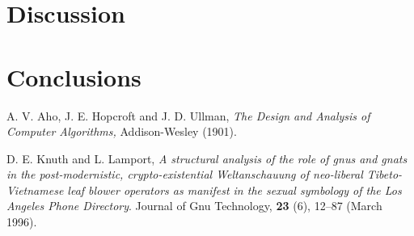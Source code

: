 \documentclass[11pt,twoside]{article}
\begin{document}
\section{Discussion}


\section{Conclusions}

 

\begin{thebibliography}{99}

 A. V. Aho, J. E. Hopcroft and J.  D.  Ullman, {\it The
Design and Analysis of Computer Algorithms,} Addison-Wesley (1901).

 D. E. Knuth and L. Lamport, {\it A structural analysis
of the role of gnus and gnats in the post-modernistic, crypto-existential 
Weltanschauung of neo-liberal Tibeto-Vietnamese leaf blower operators 
as manifest in the sexual symbology of the Los Angeles Phone Directory}.
Journal of Gnu Technology, {\bf 23} (6), 12--87
(March 1996).

\end{thebibliography}
\end{document}
